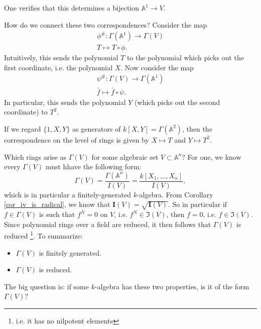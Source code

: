 \documentclass[12pt]{article}
\begin{document}
\begin{example}
\begin{centering}
	\end{centering}

	One verifies that this determines a bijection $\mathbb{A}^1\to V$.

	How do we connect these two correspondences? Consider the map 
	\begin{gather*}
		\phi^\#:\Gamma(\mathbb{A}^1) \to \Gamma(V) \\
		T \mapsto T\circ \phi. 
	\end{gather*}
	Intuitively, this sends the polynomial $T$ to the polynomial which picks out the first coordinate, i.e. the polynomial $X$. Now consider the map 
	\begin{gather*}
		\psi^\#: \Gamma(V) \to \Gamma(\mathbb{A}^1) \\
		\bar{f} \mapsto \bar{f}\circ \psi.
	\end{gather*}
	In particular, this sends the polynomial $Y$ (which picks out the second coordinate) to $T^2$.

	If we regard $\{1,X,Y\}$ as generators of $k[X,Y]=\Gamma(\mathbb{A}^2)$, then the correspondence on the level of rings is given by $X\mapsto T$ and $Y\mapsto T^2$.
\end{example}

Which rings arise as $\Gamma(V)$ for some algebraic set $V\subset\mathbb{A}^n$? For one, we know every $\Gamma(V)$ must hhave the following form:
\begin{equation*}
	\Gamma(V) = \frac{\Gamma(\mathbb{A}^n)}{I(V)} = \frac{k[X_1,\dots,X_n]}{I(V)},
\end{equation*}
which is in particular a finitely-generated $k$-algebra. From Corollary \ref{cor_iv_is_radical}, we know that $\mathbf{I}(V)=\sqrt{\mathbf{I}(V)}$. So in particular if $f\in \Gamma(V)$ is such that $f^N=0$ on $V$, i.e. $f^N\in \mathfrak{I}(V)$, then $f=0$, i.e. $f\in\mathfrak{I}(V)$. Since polynomial rings over a field are reduced, it then follows that $\Gamma(V)$ is reduced \footnote{i.e. it has no nilpotent elements}. To summarize:
\begin{itemize}
	\item $\Gamma(V)$ is finitely generated.
	\item $\Gamma(V)$ is reduced.
\end{itemize}
The big question is: if some $k$-algebra has these two properties, is it of the form $\Gamma(V)$?
\end{document}
